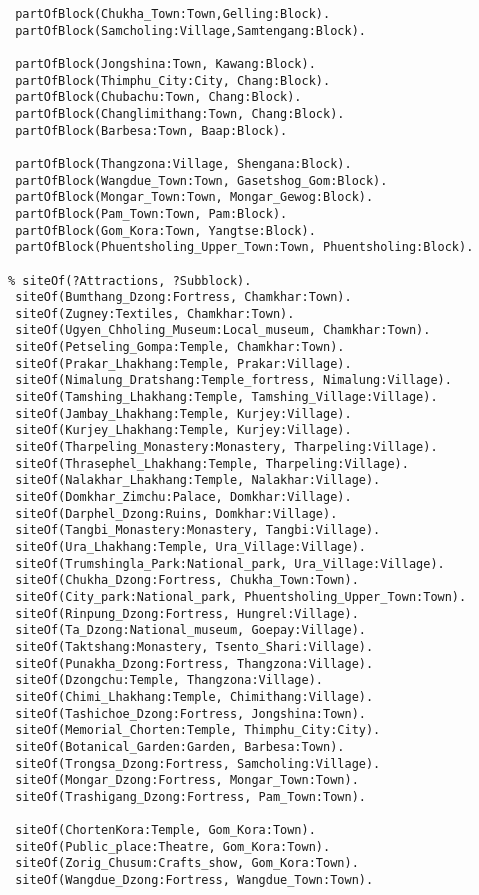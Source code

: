 \begin{verbatim}
 partOfBlock(Chukha_Town:Town,Gelling:Block).
 partOfBlock(Samcholing:Village,Samtengang:Block).

 partOfBlock(Jongshina:Town, Kawang:Block).
 partOfBlock(Thimphu_City:City, Chang:Block).
 partOfBlock(Chubachu:Town, Chang:Block).
 partOfBlock(Changlimithang:Town, Chang:Block).
 partOfBlock(Barbesa:Town, Baap:Block).

 partOfBlock(Thangzona:Village, Shengana:Block).
 partOfBlock(Wangdue_Town:Town, Gasetshog_Gom:Block).
 partOfBlock(Mongar_Town:Town, Mongar_Gewog:Block).
 partOfBlock(Pam_Town:Town, Pam:Block).
 partOfBlock(Gom_Kora:Town, Yangtse:Block).
 partOfBlock(Phuentsholing_Upper_Town:Town, Phuentsholing:Block).

% siteOf(?Attractions, ?Subblock).
 siteOf(Bumthang_Dzong:Fortress, Chamkhar:Town).
 siteOf(Zugney:Textiles, Chamkhar:Town).
 siteOf(Ugyen_Chholing_Museum:Local_museum, Chamkhar:Town).
 siteOf(Petseling_Gompa:Temple, Chamkhar:Town).
 siteOf(Prakar_Lhakhang:Temple, Prakar:Village).
 siteOf(Nimalung_Dratshang:Temple_fortress, Nimalung:Village).
 siteOf(Tamshing_Lhakhang:Temple, Tamshing_Village:Village).
 siteOf(Jambay_Lhakhang:Temple, Kurjey:Village).
 siteOf(Kurjey_Lhakhang:Temple, Kurjey:Village).
 siteOf(Tharpeling_Monastery:Monastery, Tharpeling:Village).
 siteOf(Thrasephel_Lhakhang:Temple, Tharpeling:Village).
 siteOf(Nalakhar_Lhakhang:Temple, Nalakhar:Village).
 siteOf(Domkhar_Zimchu:Palace, Domkhar:Village).
 siteOf(Darphel_Dzong:Ruins, Domkhar:Village).
 siteOf(Tangbi_Monastery:Monastery, Tangbi:Village).
 siteOf(Ura_Lhakhang:Temple, Ura_Village:Village).
 siteOf(Trumshingla_Park:National_park, Ura_Village:Village).
 siteOf(Chukha_Dzong:Fortress, Chukha_Town:Town).
 siteOf(City_park:National_park, Phuentsholing_Upper_Town:Town).
 siteOf(Rinpung_Dzong:Fortress, Hungrel:Village).
 siteOf(Ta_Dzong:National_museum, Goepay:Village).
 siteOf(Taktshang:Monastery, Tsento_Shari:Village).
 siteOf(Punakha_Dzong:Fortress, Thangzona:Village).
 siteOf(Dzongchu:Temple, Thangzona:Village).
 siteOf(Chimi_Lhakhang:Temple, Chimithang:Village).
 siteOf(Tashichoe_Dzong:Fortress, Jongshina:Town).
 siteOf(Memorial_Chorten:Temple, Thimphu_City:City).
 siteOf(Botanical_Garden:Garden, Barbesa:Town). 
 siteOf(Trongsa_Dzong:Fortress, Samcholing:Village).
 siteOf(Mongar_Dzong:Fortress, Mongar_Town:Town).
 siteOf(Trashigang_Dzong:Fortress, Pam_Town:Town).
 
 siteOf(ChortenKora:Temple, Gom_Kora:Town).
 siteOf(Public_place:Theatre, Gom_Kora:Town).
 siteOf(Zorig_Chusum:Crafts_show, Gom_Kora:Town).
 siteOf(Wangdue_Dzong:Fortress, Wangdue_Town:Town).
 

\end{verbatim}
